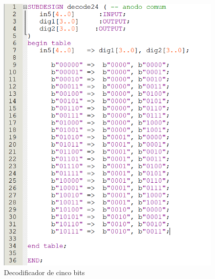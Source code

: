 \documentclass[14pt, oneside]{book}
\theoremstyle{definition}
\begin{document}
                \begin{figure}[H]
                    \centering                    
                    \includegraphics[scale = 1]{decode_5bit.PNG}
                    \caption{Decodificador de cinco bits}
                    \label{decodificador de 5 bits}
                \end{figure} \\
\end{document}
